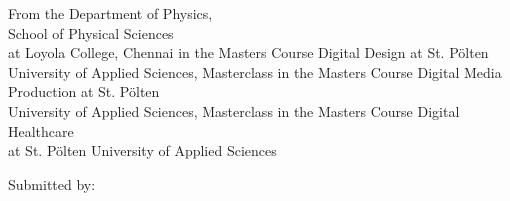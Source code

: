 \begin{center}
\ifUseMasterInteractiveTechnologies
	From the Department of Physics, \\ School of Physical Sciences \\ at Loyola College, Chennai %
\else
    \ifUseMasterDigitalDesign
	in the Masters Course Digital Design at St. Pölten\\ 
University of Applied Sciences, Masterclass \specialization
\else
    \ifUseMasterDigitalMediaProduction
	in the Masters Course Digital Media Production at St. Pölten\\ 
University of Applied Sciences, Masterclass \specialization
\else
	\ifUseMasterDigitalHealthCare
		in the Masters Course Digital Healthcare\\ 
at St. Pölten University of Applied Sciences
    \else
  	\fi
\fi\fi\fi





\vspace{1cm}

Submitted by:\\ 
\fontsize{15pt}{15pt}\selectfont
\textbf{\studentFirstName\ \studentLastName} \\
\fontsize{11pt}{15pt}\selectfont
\studentId


\end{center}
